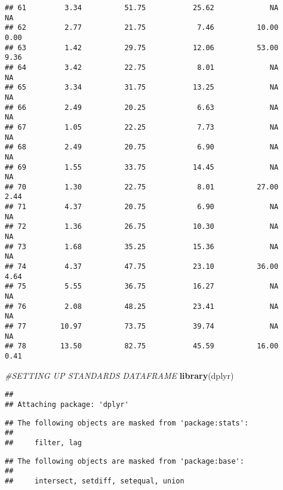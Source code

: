 \documentclass[]{article}
\newenvironment{Shaded}{\begin{snugshade}}{\end{snugshade}}
\newcommand{\CommentTok}[1]{\textcolor[rgb]{0.56,0.35,0.01}{\textit{#1}}}
\newcommand{\KeywordTok}[1]{\textcolor[rgb]{0.13,0.29,0.53}{\textbf{#1}}}
\newcommand{\NormalTok}[1]{#1}
\begin{document}
\begin{verbatim}
## 61         3.34          51.75           25.62             NA              NA
## 62         2.77          21.75            7.46          10.00            0.00
## 63         1.42          29.75           12.06          53.00            9.36
## 64         3.42          22.75            8.01             NA              NA
## 65         3.34          31.75           13.25             NA              NA
## 66         2.49          20.25            6.63             NA              NA
## 67         1.05          22.25            7.73             NA              NA
## 68         2.49          20.75            6.90             NA              NA
## 69         1.55          33.75           14.45             NA              NA
## 70         1.30          22.75            8.01          27.00            2.44
## 71         4.37          20.75            6.90             NA              NA
## 72         1.36          26.75           10.30             NA              NA
## 73         1.68          35.25           15.36             NA              NA
## 74         4.37          47.75           23.10          36.00            4.64
## 75         5.55          36.75           16.27             NA              NA
## 76         2.08          48.25           23.41             NA              NA
## 77        10.97          73.75           39.74             NA              NA
## 78        13.50          82.75           45.59          16.00            0.41
\end{verbatim}

\begin{Shaded}
\begin{Highlighting}[]
\CommentTok{#SETTING UP STANDARDS DATAFRAME}
\KeywordTok{library}\NormalTok{(dplyr)}
\end{Highlighting}
\end{Shaded}

\begin{verbatim}
## 
## Attaching package: 'dplyr'
\end{verbatim}

\begin{verbatim}
## The following objects are masked from 'package:stats':
## 
##     filter, lag
\end{verbatim}

\begin{verbatim}
## The following objects are masked from 'package:base':
## 
##     intersect, setdiff, setequal, union
\end{verbatim}
\end{document}
